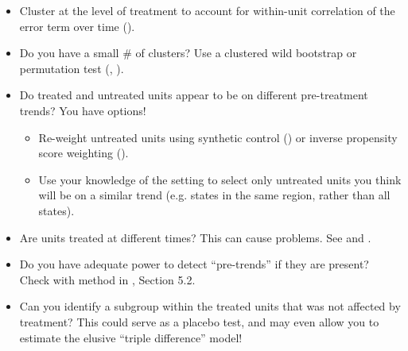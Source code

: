 
\begin{itemize}
    \item Cluster at the level of treatment to account for within-unit correlation of the error term over time (\cite{bertrand}).
    \item Do you have a small \# of clusters? Use a clustered wild bootstrap or permutation test (\cite{Cameron}, \cite{hagemann}).
\end{itemize}




\begin{itemize}
\item Do treated and untreated units appear to be on different pre-treatment trends? You have options!
\begin{itemize}
    \item Re-weight untreated units using synthetic control (\cite{Abadie}) or inverse propensity score weighting (\cite{Hirano}).
    \item Use your knowledge of the setting to select only untreated units you think will be on a similar trend (e.g. states in the same region, rather than all states).
\end{itemize} 
    \item Are units treated at different times? This can cause problems. See \cite{abraham_estimating_2018} and \cite{goodman-bacon_difference--differences_2018}.
    \item Do you have adequate power to detect ``pre-trends'' if they are present? Check with method in \cite{roth_pre-test_2019}, Section 5.2.
    \end{itemize}






\begin{itemize}
    \item Can you identify a subgroup within the treated units that was not affected by treatment? This could serve as a placebo test, and may even allow you to estimate the elusive ``triple difference'' model!
\end{itemize}




